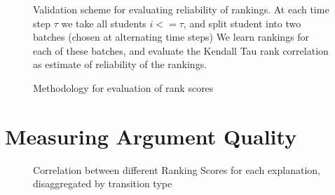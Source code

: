 \documentclass[notitlepage,12pt]{jedm}
\begin{document}
\begin{figure}
	\centering
	\def\svgscale{0.5}
	
	\caption{
		Validation scheme for evaluating reliability of rankings.
		At each time step $\tau$ we take all students $i<=\tau$, and split 
		student into two batches (chosen at alternating time steps)
		We learn rankings for each of these batches, and evaluate the Kendall 
		Tau rank correlation as estimate of reliability of the rankings.
	}
	\label{fig:rank_reliability}
\end{figure}

\begin{figure}
	\caption{Methodology for evaluation of rank scores}
	\label{fig:evaluate_rankings}
\end{figure}

\section{Measuring Argument Quality}\label{sec:measure}



\begin{figure}
	\scalebox{0.6}{}
	\caption{
		Correlation between different Ranking Scores for each explanation, 
		disaggregated by transition type  
	}
	\label{fig:acc_by_rank_score_type}
\end{figure}
\end{document}
